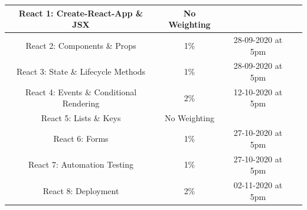 \documentclass{article}
\begin{document}
\begin{tabular}{|c|c|c|c|}
	\small React 1: Create-React-App  \& JSX                          & \small No Weighting &  \\ \hline
	\small React 2:  Components \& Props                                        & \small 1\%          & \small 28-09-2020 at 5pm \\ \hline
	\small React 3: State \& Lifecycle Methods                                       & \small 1\%          & \small 28-09-2020 at 5pm \\ \hline
	\small React 4: Events \& Conditional Rendering                      & \small 2\%          & \small 12-10-2020 at 5pm \\ \hline
	\small React 5:   Lists \& Keys                                     & \small No Weighting         & \small  \\ \hline
	\small React 6: Forms                          & \small 1\%          & \small 27-10-2020 at 5pm \\ \hline
	\small React 7: Automation Testing                            & \small 1\%          & \small 27-10-2020 at 5pm \\ \hline
	\small React 8: Deployment                       & \small 2\%          & \small 02-11-2020 at 5pm \\ \hline
\end{tabular}
\end{document}

